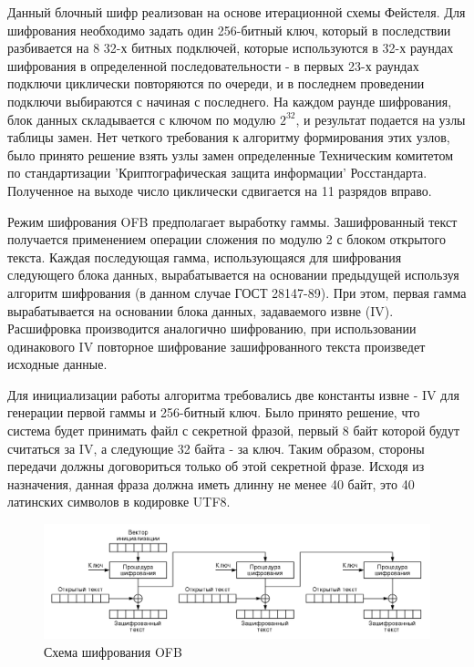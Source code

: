 \documentclass[12pt, a4paper]{article}
\begin{document}
Данный блочный шифр реализован на основе итерационной схемы Фейстеля.
Для шифрования необходимо задать один 256-битный ключ, который в
последствии разбивается на 8 32-х битных подключей, которые используются
в 32-х раундах шифрования в определенной последовательности - в первых
23-х раундах подключи циклически повторяются по очереди, и в последнем
проведении подключи выбираются с начиная с последнего. На каждом раунде
шифрования, блок данных складывается с ключом по модулю $2^{32}$, и результат
подается на узлы таблицы замен. Нет четкого требования к алгоритму формирования
этих узлов, было принято решение взять узлы замен определенные 
Техническим комитетом по стандартизации 'Криптографическая защита информации'
Росстандарта. Полученное на выходе число циклически сдвигается на 11 разрядов
вправо.

Режим шифрования OFB предполагает выработку гаммы. Зашифрованный текст получается
применением операции сложения по модулю 2 с блоком открытого текста. Каждая
последующая гамма, использующаяся для шифрования следующего блока данных,
вырабатывается на основании предыдущей используя алгоритм шифрования (в данном
случае ГОСТ 28147-89). При этом, первая гамма вырабатывается на основании
блока данных, задаваемого извне (IV). Расшифровка производится аналогично
шифрованию, при использовании одинакового IV повторное шифрование зашифрованного
текста произведет исходные данные.

Для инициализации работы алгоритма требовались две константы извне - IV для
генерации первой гаммы и 256-битный ключ. Было принято решение, что система
будет принимать файл с секретной фразой, первый 8 байт которой будут считаться
за IV, а следующие 32 байта - за ключ. Таким образом, стороны передачи должны
договориться только об этой секретной фразе. Исходя из назначения, данная
фраза должна иметь длинну не менее 40 байт, это 40 латинских символов в
кодировке UTF8.

\begin{figure}[t]
    \includegraphics[scale = 0.5]{ofb_enc}
    \caption{Схема шифрования OFB}
    \centering
\end{figure}
\end{document}
